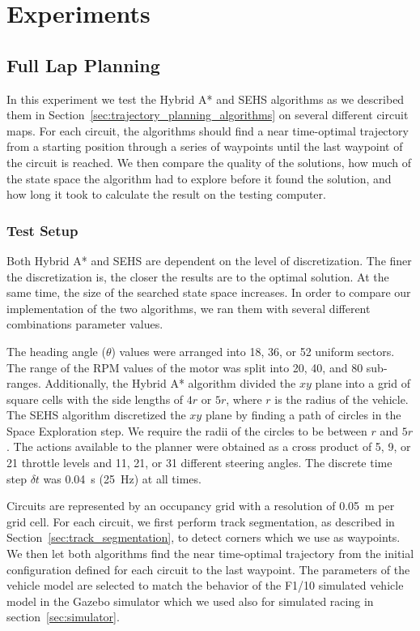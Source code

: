 \chapter{Experiments}
\label{chapter:experiments}

\section{Full Lap Planning}

In this experiment we test the Hybrid A* and \gls{SEHS} algorithms as we described them in Section~\ref{sec:trajectory_planning_algorithms} on several different circuit maps. For each circuit, the algorithms should find a near time-optimal trajectory from a starting position through a series of waypoints until the last waypoint of the circuit is reached. We then compare the quality of the solutions, how much of the state space the algorithm had to explore before it found the solution, and how long it took to calculate the result on the testing computer.

\subsection{Test Setup}

Both Hybrid A* and \gls*{SEHS} are dependent on the level of discretization. The finer the discretization is, the closer the results are to the optimal solution. At the same time, the size of the searched state space increases. In order to compare our implementation of the two algorithms, we ran them with several different combinations parameter values.

The heading angle ($\theta$) values were arranged into \num{18}, \num{36}, or \num{52} uniform sectors. The range of the \gls*{RPM} values of the motor was split into \num{20}, \num{40}, and \num{80} sub-ranges. Additionally, the Hybrid A* algorithm divided the $xy$ plane into a grid of square cells with the side lengths of $4r$ or $5r$, where $r$ is the radius of the vehicle. The \gls*{SEHS} algorithm discretized the $xy$ plane by finding a path of circles in the Space Exploration step. We require the radii of the circles to be between $r$ and $5r$. The actions available to the planner were obtained as a cross product of \num{5}, \num{9}, or \num{21} throttle levels and \num{11}, \num{21}, or \num{31} different steering angles. The discrete time step $\delta t$ was \SI{0.04}{\second} (\SI{25}{\hertz}) at all times.

Circuits are represented by an occupancy grid with a resolution of \SI{0.05}{\meter} per grid cell. For each circuit, we first perform track segmentation, as described in Section~\ref{sec:track_segmentation}, to detect corners which we use as waypoints. We then let both algorithms find the near time-optimal trajectory from the initial configuration defined for each circuit to the last waypoint. The parameters of the vehicle model are selected to match the behavior of the F1/10 simulated vehicle model in the Gazebo simulator which we used also for simulated racing in section~\ref{sec:simulator}.

